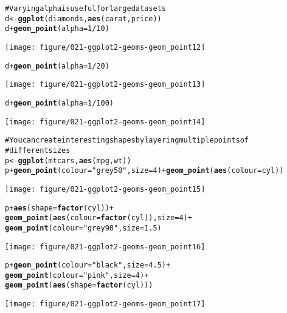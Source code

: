 \documentclass[a4paper,titlepage]{tufte-handout}\usepackage{graphicx, color}
\makeatletter
\def\maxwidth{ %
  \ifdim\Gin@nat@width>\linewidth
    \linewidth
  \else
    \Gin@nat@width
  \fi
}
\newcommand{\hlfunctioncall}[1]{\textcolor[rgb]{0.501960784313725,0,0.329411764705882}{\textbf{#1}}}%
\newcommand{\hlstring}[1]{\textcolor[rgb]{0.6,0.6,1}{#1}}%
\newcommand{\hlcomment}[1]{\textcolor[rgb]{0.180392156862745,0.6,0.341176470588235}{#1}}%
\newenvironment{kframe}{%
 \def\at@end@of@kframe{}%
 \ifinner\ifhmode%
  \def\at@end@of@kframe{\end{minipage}}%
  \begin{minipage}{\columnwidth}%
 \fi\fi%
 \def\FrameCommand##1{\hskip\@totalleftmargin \hskip-\fboxsep
 \colorbox{shadecolor}{##1}\hskip-\fboxsep
     \hskip-\linewidth \hskip-\@totalleftmargin \hskip\columnwidth}%
 \MakeFramed {\advance\hsize-\width
   \@totalleftmargin\z@ \linewidth\hsize
   \@setminipage}}%
 {\par\unskip\endMakeFramed%
 \at@end@of@kframe}
\newenvironment{knitrout}{}{} %
\makeatother
\begin{document}
\begin{knitrout}
\begin{kframe}
\begin{alltt}
\hlcomment{# Varying alpha is useful for large datasets}
d <- \hlfunctioncall{ggplot}(diamonds, \hlfunctioncall{aes}(carat, price))
d + \hlfunctioncall{geom_point}(alpha = 1/10)
\end{alltt}
\end{kframe}
\texttt{[image: figure/021-ggplot2-geoms-geom\_point12]} 
\begin{kframe}\begin{alltt}
d + \hlfunctioncall{geom_point}(alpha = 1/20)
\end{alltt}
\end{kframe}
\texttt{[image: figure/021-ggplot2-geoms-geom\_point13]} 
\begin{kframe}\begin{alltt}
d + \hlfunctioncall{geom_point}(alpha = 1/100)
\end{alltt}
\end{kframe}
\texttt{[image: figure/021-ggplot2-geoms-geom\_point14]} 
\begin{kframe}\begin{alltt}

\hlcomment{# You can create interesting shapes by layering multiple points of}
\hlcomment{# different sizes}
p <- \hlfunctioncall{ggplot}(mtcars, \hlfunctioncall{aes}(mpg, wt))
p + \hlfunctioncall{geom_point}(colour=\hlstring{"grey50"}, size = 4) + \hlfunctioncall{geom_point}(\hlfunctioncall{aes}(colour = cyl))
\end{alltt}
\end{kframe}
\texttt{[image: figure/021-ggplot2-geoms-geom\_point15]} 
\begin{kframe}\begin{alltt}
p + \hlfunctioncall{aes}(shape = \hlfunctioncall{factor}(cyl)) +
  \hlfunctioncall{geom_point}(\hlfunctioncall{aes}(colour = \hlfunctioncall{factor}(cyl)), size = 4) +
  \hlfunctioncall{geom_point}(colour=\hlstring{"grey90"}, size = 1.5)
\end{alltt}
\end{kframe}
\texttt{[image: figure/021-ggplot2-geoms-geom\_point16]} 
\begin{kframe}\begin{alltt}
p + \hlfunctioncall{geom_point}(colour=\hlstring{"black"}, size = 4.5) +
  \hlfunctioncall{geom_point}(colour=\hlstring{"pink"}, size = 4) +
  \hlfunctioncall{geom_point}(\hlfunctioncall{aes}(shape = \hlfunctioncall{factor}(cyl)))
\end{alltt}
\end{kframe}
\texttt{[image: figure/021-ggplot2-geoms-geom\_point17]} 
\begin{kframe}\begin{alltt}


\end{alltt}
\end{kframe}
\end{knitrout}
\end{document}
